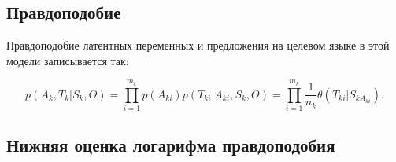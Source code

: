 \documentclass[10pt]{article}
\begin{document}
	\subsection*{Правдоподобие}
	
	Правдоподобие латентных переменных и предложения на целевом языке в этой модели записывается так:
	
	$$
	p(A_k, T_k | S_k, \Theta) = \prod_{i=1}^{m_k} p(A_{ki}) p(T_{ki} | A_{ki}, S_{k}, \Theta) = \prod_{i=1}^{m_k} \frac{1}{n_k} \theta(T_{ki} | S_{k{A_{ki}}}).
	$$ 
	
	\subsection*{Нижняя оценка логарифма правдоподобия}
	
\end{document}
